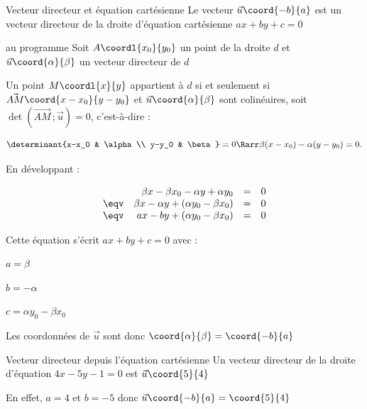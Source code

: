 \begin{prop}{Vecteur directeur et équation cartésienne}
	Le vecteur $\vec{u}\coord{-b}{a}$ est un vecteur directeur de la droite d'équation cartésienne $ax + by + c = 0$
\end{prop}

\begin{demo}{au programme}
	Soit $A\coordl{x_0}{y_0}$ un point de la droite $d$ et $\vec{u}\coord{\alpha}{\beta}$ un vecteur directeur de $d$

	Un point $M\coordl{x}{y}$ appartient à $d$ si et seulement si $\vec{AM}\coord{x-x_0}{y-y_0}$ et $\vec{u}\coord{\alpha}{\beta}$ sont colinéaires, soit $\det(\vec{AM}\,;\vec{u}) = 0$, c'est-à-dire :

	\[
		\determinant{x-x_0 & \alpha \\ y-y_0 & \beta} = 0
		\Rarr \beta(x-x_0) - \alpha(y-y_0) = 0.
	\]

	En développant :

	$$
		\begin{array}{crcl}
			~    & \beta x - \beta x_0 - \alpha y + \alpha y_0   & = & 0 \\
			\eqv & \beta x - \alpha y + (\alpha y_0 - \beta x_0) & = & 0 \\
			\eqv & ax - by + (\alpha y_0 - \beta x_0)            & = & 0 \\
		\end{array}
	$$

	Cette équation s'écrit $ax + by + c = 0$ avec :
	\bi
	\item $a = \beta$
	\item $b = -\alpha$
	\item $c = \alpha y_0 - \beta x_0$
	\ei

	Les coordonnées de $\vec{u}$ sont donc $\coord{\alpha}{\beta} = \coord{-b}{a}$
\end{demo}

\newpage

\begin{ex}{Vecteur directeur depuis l'équation cartésienne}
	Un vecteur directeur de la droite d'équation $4x - 5y - 1 = 0$ est $\vec{u}\coord{5}{4}$

	En effet, $a = 4$ et $b = -5$ donc $\vec{u}\coord{-b}{a} = \coord{5}{4}$
\end{ex}

